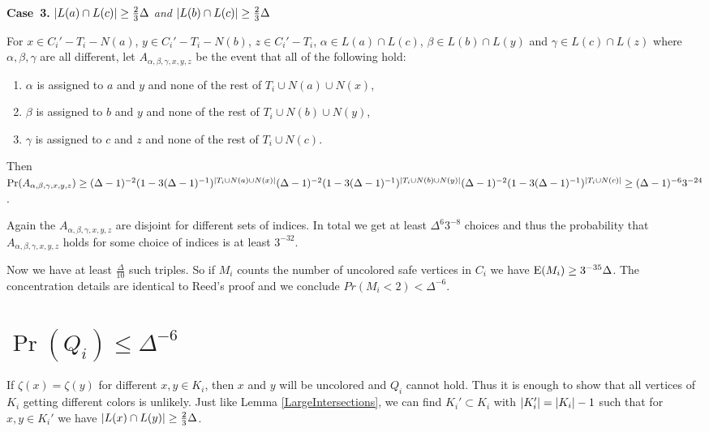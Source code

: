 \textbf{Case~3.} \textit{$\left|L(a) \cap L(c)\right| \geq \frac23 \Delta$ and $\left|L(b)
\cap L(c)\right| \geq \frac23 \Delta$}

For $x \in C_i' - T_i - N(a)$, $y \in C_i' - T_i - N(b)$, $z \in C_i' - T_i$,
$\alpha \in L(a) \cap L(c)$, $\beta \in L(b) \cap L(y)$ and $\gamma \in L(c)
\cap L(z)$ where $\alpha, \beta, \gamma$ are all different, let $A_{\alpha,
\beta, \gamma, x, y, z}$ be the event that all of the following hold:

\begin{enumerate}
  \item $\alpha$ is assigned to $a$ and $y$ and none of the rest of $T_i \cup
  N(a) \cup N(x)$,
  \item $\beta$ is assigned to $b$ and $y$ and none of the rest of $T_i \cup
  N(b) \cup N(y)$,
  \item $\gamma$ is assigned to $c$ and $z$ and none of the rest of $T_i \cup N(c)$.
\end{enumerate}

Then $\Pr(A_{\alpha, \beta, \gamma, x, y, z}) \geq (\Delta-1)^{-2}(1-
3(\Delta-1)^{-1})^{\left|T_i \cup N(a) \cup N(x)\right|}(\Delta-1)^{-2}(1-
3(\Delta-1)^{-1})^{\left|T_i \cup N(b) \cup N(y)\right|}(\Delta-1)^{-2}(1-
3(\Delta-1)^{-1})^{\left|T_i \cup N(c)\right|} \geq (\Delta-1)^{-6}3^{-24}$.

Again the $A_{\alpha, \beta, \gamma, x, y, z}$ are disjoint for different sets
of indices. In total we get at least $\Delta^6 3^{-8}$
choices and thus the probability that $A_{\alpha, \beta, \gamma, x, y, z}$ holds
for some choice of indices is at least $3^{-32}$.

\bigskip

Now we have at least $\frac{\Delta}{10}$ such triples.  So if $M_i$ counts the
number of uncolored safe vertices in $C_i$ we have $\operatorname{E}(M_i) \geq
3^{-35}\Delta$.  The concentration details are identical to Reed's proof and we
conclude $Pr(M_i < 2) < \Delta^{-6}$.

\section{\texorpdfstring{$\Pr(Q_i) \leq \Delta^{-6}$}{The Q events}}
If $\zeta(x) = \zeta(y)$ for different $x,y \in K_i$, then $x$ and $y$ will be
uncolored and $Q_i$ cannot hold.  Thus it is enough to show that all vertices of
$K_i$ getting different colors is unlikely.  Just like Lemma
\ref{LargeIntersections}, we can find $K_i' \subset K_i$ with $\left|K_i'\right| =
\left|K_i\right| - 1$ such that for $x,y \in K_i'$ we have $\left|L(x) \cap L(y)\right|
\geq \frac23 \Delta$.  

